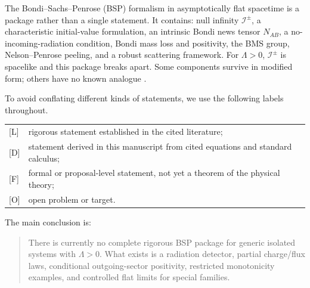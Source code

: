 \documentclass[11pt,a4paper]{article}
\newcommand{\scri}{\mathscr{I}}
\newcommand{\statusL}{\textsf{[L]}}
\newcommand{\statusD}{\textsf{[D]}}
\newcommand{\statusF}{\textsf{[F]}}
\newcommand{\statusO}{\textsf{[O]}}
\begin{document}
The Bondi--Sachs--Penrose (BSP) formalism in asymptotically flat spacetime is a package rather than a single statement.  It contains: null infinity \(\scri^\pm\), a characteristic initial-value formulation, an intrinsic Bondi news tensor \(N_{AB}\), a no-incoming-radiation condition, Bondi mass loss and positivity, the BMS group, Nelson--Penrose peeling, and a robust scattering framework.  For \(\Lambda>0\), \(\scri^\pm\) is spacelike and this package breaks apart.  Some components survive in modified form; others have no known analogue \cite{ashtekar2017implications,poole2019bondi,poole2025charges}.

To avoid conflating different kinds of statements, we use the following labels throughout.

\begin{center}
\begin{tabular}{ll}
\statusL & rigorous statement established in the cited literature;\\[2mm]
\statusD & statement derived in this manuscript from cited equations and standard calculus;\\[2mm]
\statusF & formal or proposal-level statement, not yet a theorem of the physical theory;\\[2mm]
\statusO & open problem or target.
\end{tabular}
\end{center}

The main conclusion is:

\begin{quote}
There is currently no complete rigorous BSP package for generic isolated systems with \(\Lambda>0\).  What exists is a radiation detector, partial charge/flux laws, conditional outgoing-sector positivity, restricted monotonicity examples, and controlled flat limits for special families.
\end{quote}
\end{document}

